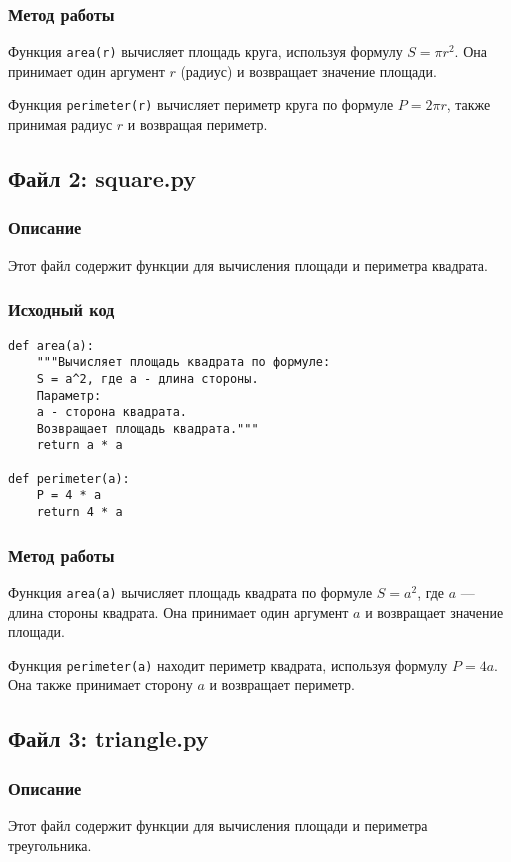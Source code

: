 \documentclass{article}
\begin{document}
\subsubsection{Метод работы}
Функция \texttt{area(r)} вычисляет площадь круга, используя формулу \( S = \pi r^2 \). Она принимает один аргумент \( r \) (радиус) и возвращает значение площади. 

Функция \texttt{perimeter(r)} вычисляет периметр круга по формуле \( P = 2\pi r \), также принимая радиус \( r \) и возвращая периметр.

\newpage

\subsection{Файл 2: square.py}
\subsubsection{Описание}
Этот файл содержит функции для вычисления площади и периметра квадрата.

\subsubsection{Исходный код}
\begin{verbatim}
def area(a):
    """Вычисляет площадь квадрата по формуле: 
    S = a^2, где a - длина стороны.
    Параметр:
    a - сторона квадрата.
    Возвращает площадь квадрата."""
    return a * a

def perimeter(a):
    P = 4 * a
    return 4 * a
\end{verbatim}

\subsubsection{Метод работы}
Функция \texttt{area(a)} вычисляет площадь квадрата по формуле \( S = a^2 \), где \( a \) — длина стороны квадрата. Она принимает один аргумент \( a \) и возвращает значение площади.

Функция \texttt{perimeter(a)} находит периметр квадрата, используя формулу \( P = 4a \). Она также принимает сторону \( a \) и возвращает периметр.

\newpage

\subsection{Файл 3: triangle.py}
\subsubsection{Описание}
Этот файл содержит функции для вычисления площади и периметра треугольника.
\end{document}
